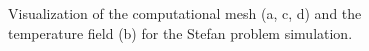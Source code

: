 \begin{figure}[ht!]
\begin{center}
\caption{Visualization of the computational mesh (a, c, d) and the temperature field (b) for the Stefan problem simulation.} \label{fig:stefan_grid}
\end{center}
\end{figure}

